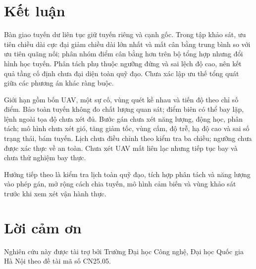 \documentclass[11pt,a4paper]{article}
\newif\ifanonymous
\begin{document}
\FloatBarrier
\section{Kết luận}

Bàn giao tuyến dư liên tục giữ tuyến riêng và cạnh gốc. Trong tập khảo sát, ưu tiên chiều dài cực đại giảm chiều dài lớn nhất và mất cân bằng trung bình so với ưu tiên quãng nối; phân nhóm điểm cân bằng hơn trên bộ tổng hợp nhưng đổi hình học tuyến. Phân tách phụ thuộc ngưỡng đứng và sai lệch độ cao, nên kết quả tầng cố định chưa đại diện toàn quỹ đạo. Chưa xác lập ưu thế tổng quát giữa các phương án khác ràng buộc.

Giới hạn gồm bốn UAV, một sự cố, vùng quét kề nhau và tiến độ theo chỉ số điểm. Bảo toàn tuyến không đo chất lượng quan sát; điểm biên có thể bay lặp, lệnh ngoài tọa độ chưa xét đủ. Bước gán chưa xét năng lượng, động học, phân tách; mô hình chưa xét gió, tăng giảm tốc, vùng cấm, độ trễ, hạ độ cao và sai số trạng thái, bám tuyến. Lịch chưa điều chỉnh theo kiểm tra ba chiều; ngưỡng chưa được xác thực về an toàn. Chưa xét UAV mất liên lạc nhưng tiếp tục bay và chưa thử nghiệm bay thực.

Hướng tiếp theo là kiểm tra lịch toàn quỹ đạo, tích hợp phân tách và năng lượng vào phép gán, mở rộng cách chia tuyến, mô hình cảm biến và vùng khảo sát trước khi xem xét vận hành thực.

\ifanonymous\else
\section*{Lời cảm ơn}
Nghiên cứu này được tài trợ bởi Trường Đại học Công nghệ, Đại học Quốc gia Hà Nội theo đề tài mã số CN25.05.
\fi


\fontsize{10}{11.5}\selectfont
\makeatletter
\let\tnu@bibitem\@bibitem
\def\@bibitem#1{\setlength{\itemsep}{0pt}\setlength{\parsep}{0pt}\tnu@bibitem{#1}}
\makeatother
\renewcommand{\refname}{TÀI LIỆU THAM KHẢO/ REFERENCES}

\end{document}
